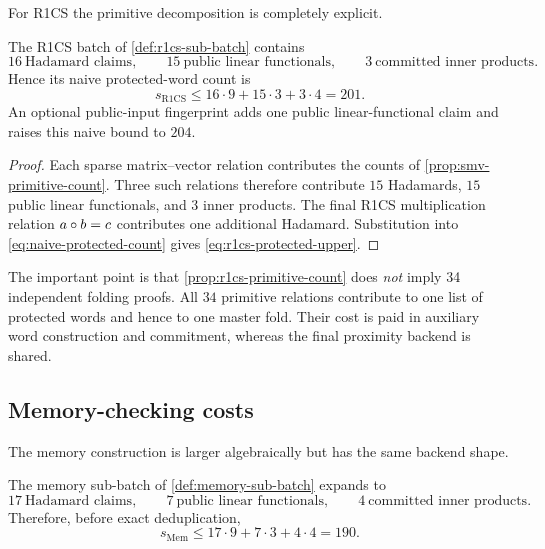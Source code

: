 For R1CS the primitive decomposition is completely explicit.

\begin{proposition}
\label{prop:r1cs-primitive-count}
The R1CS batch of \cref{def:r1cs-sub-batch} contains
\begin{equation}
  16\ \text{Hadamard claims},
  \qquad
  15\ \text{public linear functionals},
  \qquad
  3\ \text{committed inner products}.
  \label{eq:r1cs-primitive-count}
\end{equation}
Hence its naive protected-word count is
\begin{equation}
  s_{\mathrm{R1CS}}
  \le16\cdot9+15\cdot3+3\cdot4
  =201.
  \label{eq:r1cs-protected-upper}
\end{equation}
An optional public-input fingerprint adds one public linear-functional claim and raises this naive bound to $204$.
\end{proposition}

\begin{proof}
Each sparse matrix--vector relation contributes the counts of \cref{prop:smv-primitive-count}.  Three such relations therefore contribute $15$ Hadamards, $15$ public linear functionals, and $3$ inner products.  The final R1CS multiplication relation $a\circ b=c$ contributes one additional Hadamard.  Substitution into \eqref{eq:naive-protected-count} gives \eqref{eq:r1cs-protected-upper}.
\end{proof}

The important point is that \cref{prop:r1cs-primitive-count} does \emph{not} imply 34 independent folding proofs.  All $34$ primitive relations contribute to one list of protected words and hence to one master fold.  Their cost is paid in auxiliary word construction and commitment, whereas the final proximity backend is shared.

\subsection{Memory-checking costs}
\label{sec:complexity-memory}

The memory construction is larger algebraically but has the same backend shape.

\begin{proposition}
\label{prop:memory-primitive-count}
The memory sub-batch of \cref{def:memory-sub-batch} expands to
\begin{equation}
  17\ \text{Hadamard claims},
  \qquad
  7\ \text{public linear functionals},
  \qquad
  4\ \text{committed inner products}.
  \label{eq:memory-primitive-count}
\end{equation}
Therefore, before exact deduplication,
\begin{equation}
  s_{\mathrm{Mem}}
  \le17\cdot9+7\cdot3+4\cdot4
  =190.
  \label{eq:memory-protected-upper}
\end{equation}
\end{proposition}

